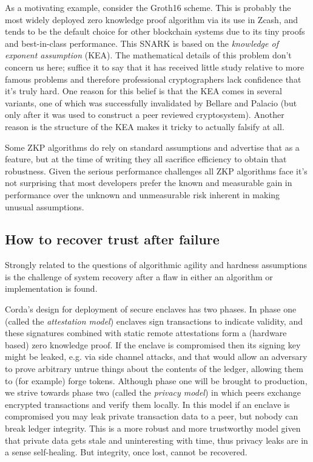 \documentclass{article}
\begin{document}
As a motivating example, consider the Groth16 scheme\cite{groth2016}. This is probably the most widely deployed
zero knowledge proof algorithm via its use in Zcash, and tends to be the default choice for other blockchain
systems due to its tiny proofs and best-in-class performance. This SNARK is based on the \emph{knowledge of
exponent assumption} (KEA). The mathematical details of this problem don't concern us here; suffice it to say that
it has received little study relative to more famous problems and therefore professional cryptographers lack
confidence that it's truly hard. One reason for this belief is that the KEA comes in several variants, one of which
was successfully invalidated by Bellare and Palacio\cite{bellare2004knowledge} (but only after it was used to
construct a peer reviewed cryptosystem). Another reason is the structure of the KEA makes it tricky to actually
falsify at all.

Some ZKP algorithms do rely on standard assumptions and advertise that as a feature, but at the time of
writing they all sacrifice efficiency to obtain that robustness. Given the serious performance challenges
all ZKP algorithms face it's not surprising that most developers prefer the known and measurable gain in
performance over the unknown and unmeasurable risk inherent in making unusual assumptions.

\subsection{How to recover trust after failure}\label{subsec:how-to-recover-trust-after-failure}

Strongly related to the questions of algorithmic agility and hardness assumptions is the challenge of system
recovery after a flaw in either an algorithm or implementation is found.

Corda's design for deployment of secure enclaves has two phases. In phase one (called the \emph{attestation model})
enclaves sign transactions to indicate validity, and these signatures combined with static remote attestations form
a (hardware based) zero knowledge proof. If the enclave is compromised then its signing key might be leaked, e.g.
via side channel attacks, and that would allow an adversary to prove arbitrary untrue things about the contents of
the ledger, allowing them to (for example) forge tokens. Although phase one will be brought to production, we
strive towards phase two (called the \emph{privacy model}) in which peers exchange encrypted transactions and
verify them locally. In this model if an enclave is compromised you may leak private transaction data to a peer,
but nobody can break ledger integrity. This is a more robust and more trustworthy model given that private data
gets stale and uninteresting with time, thus privacy leaks are in a sense self-healing. But integrity, once lost,
cannot be recovered.
\end{document}
